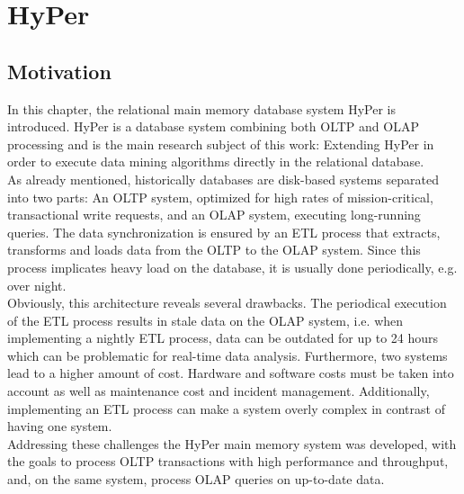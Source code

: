 \chapter{HyPer}\label{chapter:hyper}
\section{Motivation}
In this chapter, the relational main memory database system HyPer is introduced. HyPer is a database system combining both OLTP and OLAP processing and is the main research subject of this work: Extending HyPer in order to execute data mining algorithms directly in the relational database.
\\
As already mentioned, historically databases are disk-based systems separated into two parts: An OLTP system, optimized for high rates of mission-critical, transactional write requests, and an OLAP system, executing long-running queries. The data synchronization is ensured by an ETL process that extracts, transforms and loads data from the OLTP to the OLAP system. Since this process implicates heavy load on the database, it is usually done periodically, e.g. over night. 
\\
Obviously, this architecture reveals several drawbacks. The periodical execution of the ETL process results in stale data on the OLAP system, i.e. when implementing a nightly ETL process, data can be outdated for up to 24 hours which can be problematic for real-time data analysis. Furthermore, two systems lead to a higher amount of cost. Hardware and software costs must be taken into account as well as maintenance cost and incident management. Additionally, implementing an ETL process can make a system overly complex in contrast of having one system.
\\
Addressing these challenges the HyPer main memory system was developed, with the goals to process OLTP transactions with high performance and throughput, and, on the same system, process OLAP queries on up-to-date data. 


